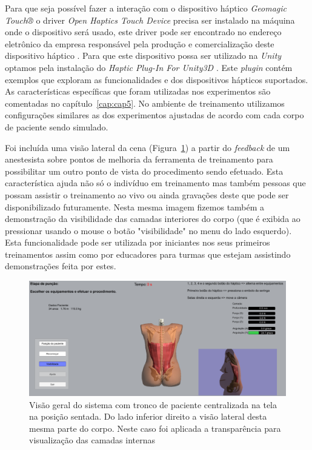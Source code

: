 Para que seja possível fazer a interação com o dispositivo háptico \textit{Geomagic Touch®} o driver \textit{Open Haptics Touch Device} precisa ser instalado na máquina onde o dispositivo será usado, este driver pode ser encontrado no endereço eletrônico da empresa responsável pela produção e comercialização deste dispositivo háptico \cite{3DSystemsTouch2018}. Para que este dispositivo possa ser utilizado na \textit{Unity} optamos pela instalação do \textit{Haptic Plug-In For Unity3D} \cite{Poyade2014}. Este \textit{plugin} contém exemplos que exploram as funcionalidades e dos dispositivos hápticos suportados. As características específicas que foram utilizadas nos experimentos são comentadas no capítulo~\ref{cap:cap5}. No ambiente de treinamento utilizamos configurações similares as dos experimentos ajustadas de acordo com cada corpo de paciente sendo simulado. 

Foi incluída uma visão lateral da cena (Figura~\ref{fig:posicaoSentadaComTransparencia}) a partir do \textit{feedback} de um anestesista sobre pontos de melhoria da ferramenta de treinamento para possibilitar um outro ponto de vista do procedimento sendo efetuado. Esta característica ajuda não só o indivíduo em treinamento mas também pessoas que possam assistir o treinamento ao vivo ou ainda gravações deste que pode ser disponibilizado futuramente. Nesta mesma imagem fizemos também a demonstração da visibilidade das camadas interiores do corpo (que é exibida ao pressionar usando o mouse o botão "visibilidade" no menu do lado esquerdo). Esta funcionalidade pode ser utilizada por iniciantes nos seus primeiros treinamentos assim como por educadores para turmas que estejam assistindo demonstrações feita por estes.  

\begin{figure}[ht!]
    \centering
    \includegraphics[width=0.9\linewidth]{capitulos/figuras/sistema posicao sentada com transparencia.png} 
    \caption{Visão geral do sistema com tronco de paciente centralizada na tela na posição sentada. Do lado inferior direito a visão lateral desta mesma parte do corpo. Neste caso foi aplicada a transparência para visualização das camadas internas}
    \label{fig:posicaoSentadaComTransparencia}
\end{figure}

